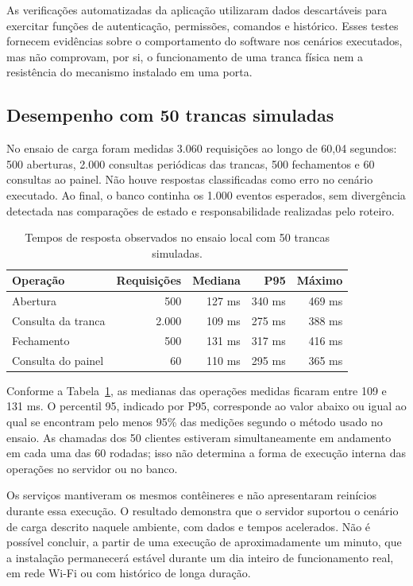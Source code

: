 \documentclass[12pt]{article}
\begin{document}
As verificações automatizadas da aplicação utilizaram dados descartáveis para exercitar funções de autenticação, permissões, comandos e histórico. Esses testes fornecem evidências sobre o comportamento do software nos cenários executados, mas não comprovam, por si, o funcionamento de uma tranca física nem a resistência do mecanismo instalado em uma porta.

\subsection{Desempenho com 50 trancas simuladas}

No ensaio de carga foram medidas 3.060 requisições ao longo de 60,04 segundos: 500 aberturas, 2.000 consultas periódicas das trancas, 500 fechamentos e 60 consultas ao painel. Não houve respostas classificadas como erro no cenário executado. Ao final, o banco continha os 1.000 eventos esperados, sem divergência detectada nas comparações de estado e responsabilidade realizadas pelo roteiro.

\begin{table}[htbp]
  \centering
  \caption{Tempos de resposta observados no ensaio local com 50 trancas simuladas.}
  \label{tab:desempenho}
  \small
  \begin{tabular}{lrrrr}
    \toprule
    Operação & Requisições & Mediana & P95 & Máximo \\
    \midrule
    Abertura & 500 & 127 ms & 340 ms & 469 ms \\
    Consulta da tranca & 2.000 & 109 ms & 275 ms & 388 ms \\
    Fechamento & 500 & 131 ms & 317 ms & 416 ms \\
    Consulta do painel & 60 & 110 ms & 295 ms & 365 ms \\
    \bottomrule
  \end{tabular}
\end{table}

Conforme a Tabela~\ref{tab:desempenho}, as medianas das operações medidas ficaram entre 109 e 131 ms. O percentil 95, indicado por P95, corresponde ao valor abaixo ou igual ao qual se encontram pelo menos 95\% das medições segundo o método usado no ensaio. As chamadas dos 50 clientes estiveram simultaneamente em andamento em cada uma das 60 rodadas; isso não determina a forma de execução interna das operações no servidor ou no banco.

Os serviços mantiveram os mesmos contêineres e não apresentaram reinícios durante essa execução. O resultado demonstra que o servidor suportou o cenário de carga descrito naquele ambiente, com dados e tempos acelerados. Não é possível concluir, a partir de uma execução de aproximadamente um minuto, que a instalação permanecerá estável durante um dia inteiro de funcionamento real, em rede Wi-Fi ou com histórico de longa duração.
\end{document}
